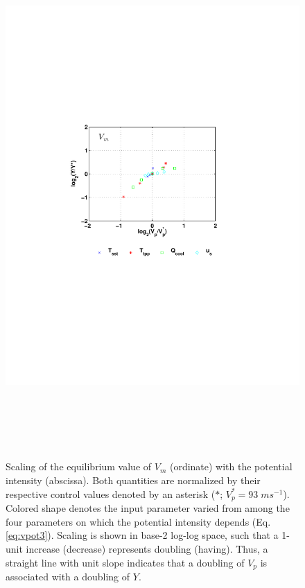 \documentclass[12pt]{article}
\begin{document}
\begin{figure}[h!]
\centering
  \noindent\includegraphics[width=15cm,height=20cm]{FIGURES/MPI_collapse_V.pdf}
\caption{Scaling of the equilibrium value of $V_m$ (ordinate) with the potential intensity (abscissa). Both quantities are normalized by their respective control values denoted by an asterisk ($*$; $V^*_p = 93 \; ms^{-1}$). Colored shape denotes the input parameter varied from among the four parameters on which the potential intensity depends (Eq. \eqref{eq:vpot3}). Scaling is shown in base-2 log-log space, such that a 1-unit increase (decrease) represents doubling (having).  Thus, a straight line with unit slope indicates that a doubling of $V_p$ is associated with a doubling of $Y$.}
\label{fig:mpicollapse_V}
\end{figure}
\end{document}
